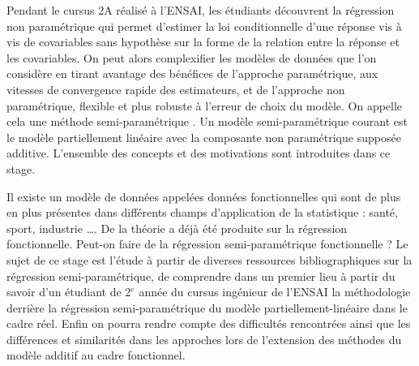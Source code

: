 Pendant le cursus 2A réalisé à l'ENSAI, les étudiants découvrent la régression non paramétrique qui permet d'estimer la loi conditionnelle d'une réponse vis à vis de covariables sans hypothèse sur la forme de la relation entre la réponse et les covariables. On peut alors complexifier les modèles de données que l'on considère en tirant avantage des bénéfices de l'approche paramétrique, aux vitesses de convergence rapide des estimateurs, et de l'approche non paramétrique, flexible et plus robuste à l'erreur de choix du modèle. On appelle cela une méthode \og semi-paramétrique \fg. Un modèle semi-paramétrique courant est le modèle partiellement linéaire avec la composante non paramétrique supposée additive. L'ensemble des concepts et des motivations sont introduites dans ce stage.

\bigskip

Il existe un modèle de données appelées données fonctionnelles qui sont de plus en plus présentes dans différents champs d'application de la statistique : santé, sport, industrie \ldots. De la théorie a déjà été produite sur la régression fonctionnelle. 
Peut-on faire de la régression semi-paramétrique fonctionnelle ? Le sujet de ce stage est l'étude à partir de diverses ressources bibliographiques sur la régression semi-paramétrique, de comprendre dans un premier lieu à partir du savoir d'un étudiant de 2$^e$ année du cursus ingénieur de l'ENSAI la méthodologie derrière la régression semi-paramétrique du modèle partiellement-linéaire dans le cadre réel. Enfin on pourra rendre compte des difficultés rencontrées ainsi que les différences et similarités dans les approches lors de l'extension des méthodes du modèle additif au cadre fonctionnel.